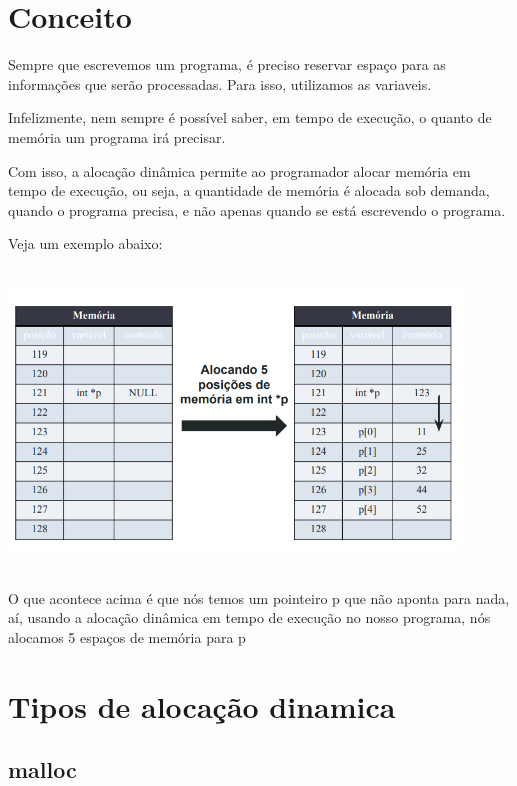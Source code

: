 \documentclass{report}
\begin{document}
	\section{Conceito}
	
	Sempre que escrevemos um programa, é preciso reservar espaço para as informações que serão processadas. Para isso, utilizamos as variaveis.
	
	Infelizmente, nem sempre é possível saber, em tempo de execução, o quanto de memória um
	programa irá precisar. 
	
	Com isso, a alocação dinâmica permite ao programador alocar memória em tempo de execução, ou seja, a quantidade de memória é alocada sob demanda, quando o programa
	precisa, e não apenas quando se
	está escrevendo o programa.
	
	Veja um exemplo abaixo:
	
	\begin{center}
		
		\includegraphics[width=12cm,height=8cm,keepaspectratio=false]{imagens/dynamicaloc.png}
		
	\end{center}
	
	O que acontece acima é que nós temos um pointeiro p que não aponta para nada, aí, usando a alocação dinâmica em tempo de execução no nosso programa, nós alocamos 5 espaços de memória para p
	
	
	\section{Tipos de alocação dinamica}
	
	\subsection{malloc}
	
\end{document}
